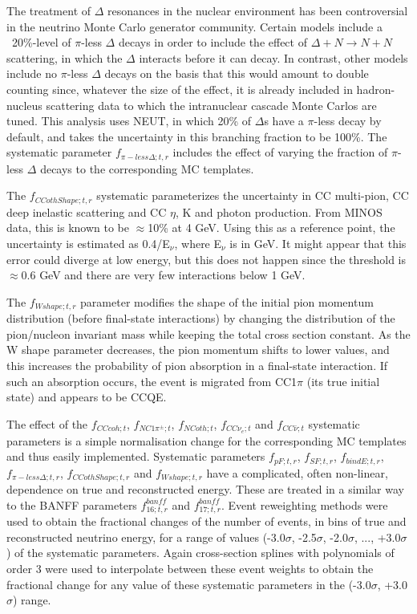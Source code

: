 \begin{enumerate}
The treatment of $\Delta$ resonances in the nuclear environment has been controversial in the neutrino
Monte Carlo generator community. Certain models include a ~20\%-level of $\pi$-less $\Delta$ decays in order
to include the effect of $\Delta+N \rightarrow N+N$ scattering, in which the $\Delta$ interacts before it can decay. 
In contrast, other models include no $\pi$-less 
$\Delta$ decays on the basis that this would amount to double counting since, whatever the size of the effect, 
it is already included in hadron-nucleus scattering data to which the intranuclear cascade Monte Carlos are tuned.
This analysis uses NEUT, in which 20\% of $\Delta$s have a $\pi$-less decay by default, and takes the uncertainty in this 
branching fraction to be 100\%. 
The systematic parameter $f_{\pi-less\Delta; t, r}$ includes the effect of varying the fraction of $\pi$-less $\Delta$ 
decays to the corresponding MC templates.

The $f_{CCothShape;t,r}$ systematic parameterizes the uncertainty in CC multi-pion, CC deep inelastic scattering and CC $\eta$, 
K and photon production. From MINOS data, this is known to be $\approx$10\% at 4 GeV. Using this as a reference point, 
the uncertainty is estimated as 0.4/E$_{\nu}$, where E$_{\nu}$ is in GeV. It might appear that this error could diverge at 
low energy, but this does not happen since the threshold is $\approx$0.6 GeV and there are very 
few interactions below 1 GeV. 

The $f_{Wshape;t,r}$ parameter modifies the shape of the initial pion momentum distribution (before final-state interactions) 
by changing the distribution of the pion/nucleon invariant mass while keeping the total cross section constant. As the 
W shape parameter decreases, the pion momentum shifts to lower values, and this increases the probability of pion 
absorption in a final-state interaction. If such an absorption occurs, the event is migrated from CC1$\pi$ (its 
true initial state) and appears to be CCQE.

The effect of the $f_{CCcoh; t}$, $f_{NC1\pi^\pm; t}$, $f_{NCoth; t}$, $f_{CC\nu_e; t}$ and $f_{CC\bar{\nu}; t}$ 
systematic parameters is a simple normalisation change for the corresponding MC templates and thus easily implemented.
Systematic parameters $f_{pF; t, r}$, $f_{SF; t, r}$, $f_{bindE; t, r}$, $f_{\pi-less\Delta; t, r}$, $f_{CCothShape; t, r}$ 
and $f_{Wshape; t, r}$  have a complicated, often non-linear, dependence on true and reconstructed energy.
These are treated in a similar way to the BANFF parameters $f_{16; t, r}^{banff}$ and $f_{17; t, r}^{banff}$.
Event reweighting methods were used to obtain the fractional changes of the number of events, 
in bins of true and reconstructed neutrino energy, for a range of values (-3.0$\sigma$, -2.5$\sigma$, -2.0$\sigma$, ..., +3.0$\sigma$)
of the systematic parameters. Again cross-section splines with polynomials of order 3 were used to interpolate between these event 
weights to obtain the fractional change for any
value of these systematic parameters in the (-3.0$\sigma$, +3.0$\sigma$) range.


\end{enumerate}
